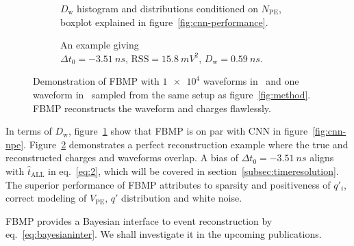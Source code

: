 \begin{figure}[H]
  \begin{subfigure}[b]{.45\textwidth}
    \centering
    \resizebox{1.05\textwidth}{!}{}
    \caption{\label{fig:fbmp-npe} $D_\mathrm{w}$ histogram and distributions conditioned on $N_{\mathrm{PE}}$, boxplot explained in figure~\ref{fig:cnn-performance}.}
  \end{subfigure}
  \hspace{0.5em}
  \begin{subfigure}[b]{.55\textwidth}
    \centering
    \resizebox{\textwidth}{!}{}
    \caption{\label{fig:fbmp} An example giving \\ $\Delta{t_0}=\SI{-3.51}{ns}$, $\mathrm{RSS}=\SI{15.8}{mV^2}$, $D_\mathrm{w}=\SI{0.59}{ns}$.}
  \end{subfigure}
  \caption{\label{fig:fbmp-performance}Demonstration of FBMP with $\num[retain-unity-mantissa=false]{1e4}$ waveforms in~ and one waveform in~ sampled from the same setup as figure~\ref{fig:method}.  FBMP reconstructs the waveform and charges flawlessly.}
\end{figure}
In terms of $D_\mathrm{w}$, figure~\ref{fig:fbmp-npe} show that FBMP is on par with CNN in figure~\ref{fig:cnn-npe}.  Figure~\ref{fig:fbmp} demonstrates a perfect reconstruction example where the true and reconstructed charges and waveforms overlap.  A bias of $\Delta{t_0}=\SI{-3.51}{ns}$ aligns with $\hat{t}_\mathrm{ALL}$ in eq.~\eqref{eq:2}, which will be covered in section~\ref{subsec:timeresolution}.  The superior performance of FBMP attributes to sparsity and positiveness of $q'_i$, correct modeling of $V_\mathrm{PE}$, $q'$ distribution and white noise.

FBMP provides a Bayesian interface to event reconstruction by eq.~\eqref{eq:bayesianinter}.  We shall investigate it in the upcoming publications.
